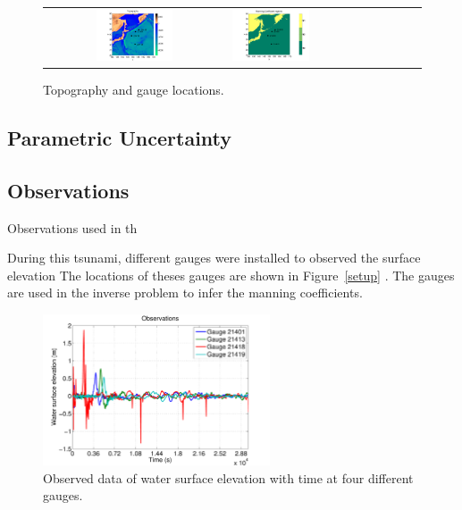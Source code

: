 \begin{figure}[h]
\centering
\begin{tabular}{clc}
\includegraphics[width=0.45\textwidth]{./figures/topo.pdf}  &
\includegraphics[width=0.45\textwidth]{./figures/coef.pdf} 
\label{setup}
\end{tabular}
\caption{Topography and gauge locations.}
\label{fig:setup}
\end{figure}

\subsection{Parametric Uncertainty}


\subsection{Observations}

Observations used in th

During this tsunami, different gauges were installed to observed the surface elevation
The locations of theses gauges are shown in Figure~\ref{setup} .
The gauges are used in the inverse problem to infer the manning coefficients.

\begin{figure}[h]      
\centering
\includegraphics[width=0.6\textwidth]{./figures/obs.pdf}
\caption{Observed data of water surface elevation with time at four different gauges.}
\label{fig:obs}
\end{figure}     
